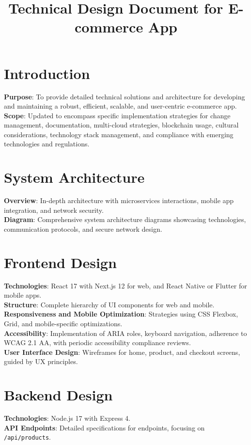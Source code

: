 \documentclass[a4paper,12pt]{article}
\title{Technical Design Document for E-commerce App}
\author{}
\begin{document}
	
	\maketitle
	
	\section*{Introduction}
	\textbf{Purpose}: To provide detailed technical solutions and architecture for developing and maintaining a robust, efficient, scalable, and user-centric e-commerce app. \\
	\textbf{Scope}: Updated to encompass specific implementation strategies for change management, documentation, multi-cloud strategies, blockchain usage, cultural considerations, technology stack management, and compliance with emerging technologies and regulations.
	
	\section*{System Architecture}
	\textbf{Overview}: In-depth architecture with microservices interactions, mobile app integration, and network security. \\
	\textbf{Diagram}: Comprehensive system architecture diagrams showcasing technologies, communication protocols, and secure network design.
	
	\section*{Frontend Design}
	\textbf{Technologies}: React 17 with Next.js 12 for web, and React Native or Flutter for mobile apps. \\
	\textbf{Structure}: Complete hierarchy of UI components for web and mobile. \\
	\textbf{Responsiveness and Mobile Optimization}: Strategies using CSS Flexbox, Grid, and mobile-specific optimizations. \\
	\textbf{Accessibility}: Implementation of ARIA roles, keyboard navigation, adherence to WCAG 2.1 AA, with periodic accessibility compliance reviews. \\
	\textbf{User Interface Design}: Wireframes for home, product, and checkout screens, guided by UX principles.
	
	\section*{Backend Design}
	\textbf{Technologies}: Node.js 17 with Express 4. \\
	\textbf{API Endpoints}: Detailed specifications for endpoints, focusing on \texttt{/api/products}.
	
\end{document}
